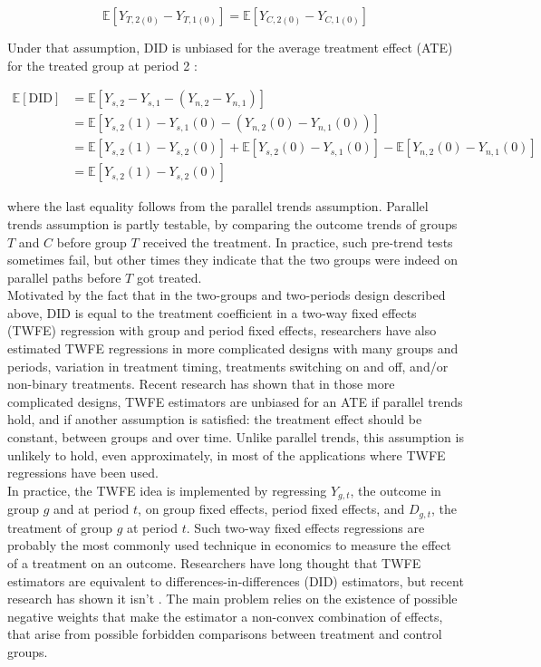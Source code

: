 \documentclass[10pt, oneside]{book}
\begin{document}
$$ \mathbb{E}[Y_{T,2(0)} - Y_{T,1(0)}] = \mathbb{E}[Y_{C,2(0)} - Y_{C,1(0)}]$$

Under that assumption, DID is unbiased for the average treatment effect (ATE) for the treated group at period 2 \citep{abadie2005semiparametric}:  

\begin{equation}
\begin{aligned}
\mathbb{E}[\text{DID}] &= \mathbb{E}[Y_{s,2} - Y_{s,1} - (Y_{n,2} - Y_{n,1})] \\
&= \mathbb{E}[Y_{s,2}(1) - Y_{s,1}(0) - (Y_{n,2}(0) - Y_{n,1}(0))] \\
&= \mathbb{E}[Y_{s,2}(1) - Y_{s,2}(0)] + \mathbb{E}[Y_{s,2}(0) - Y_{s,1}(0)] - \mathbb{E}[Y_{n,2}(0) - Y_{n,1}(0)] \\
&= \mathbb{E}[Y_{s,2}(1) - Y_{s,2}(0)]
\end{aligned}
\end{equation}

where the last equality follows from the parallel trends assumption. Parallel trends assumption is partly testable, by comparing the outcome trends of groups $T$ and $C$ before group $T$ received the treatment. In practice, such pre-trend tests sometimes fail, but other times they indicate that the two groups were indeed on parallel paths before $T$ got treated. \\

Motivated by the fact that in the two-groups and two-periods design described above, DID is equal to the treatment coefficient in a two-way fixed effects (TWFE) regression with group and period fixed effects, researchers have also estimated TWFE regressions in more complicated designs with many groups and periods, variation in treatment timing, treatments switching on and off, and/or non-binary treatments. Recent research has shown that in those more complicated designs, TWFE estimators are unbiased for an ATE if parallel trends hold, and if another assumption is satisfied: the treatment effect should be constant, between groups and over time. Unlike parallel trends, this assumption is unlikely to hold, even approximately, in most of the applications where TWFE regressions have been used. \\

In practice, the TWFE idea is implemented by regressing $Y_{g,t}$, the outcome in group $g$ and at period $t$, on group fixed effects, period fixed effects, and $D_{g,t}$, the treatment of group $g$ at period $t$. Such two-way fixed effects regressions are probably the most commonly used technique in economics to measure the effect of a treatment on an outcome. Researchers have long thought that TWFE estimators are equivalent to differences-in-differences (DID) estimators, but recent research has shown it isn't \citep{DID_survey}. The main problem relies on the existence of possible negative weights that make the estimator a non-convex combination of effects, that arise from possible forbidden comparisons between treatment and control groups. \\
\end{document}
